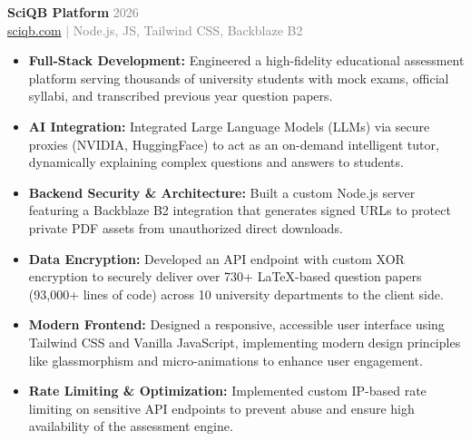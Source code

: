 \documentclass[a4paper,10pt]{article}
\begin{document}
\begin{minipage}[t]{12.2cm}
    \textbf{SciQB Platform} \hfill \textcolor{GrayText}{2026}\\
    \textcolor{GrayText}{\href{https://sciqb.com}{sciqb.com} $|$ Node.js, JS, Tailwind CSS, Backblaze B2}\\
    \begin{itemize}[leftmargin=*, noitemsep, topsep=0pt, label={\color{DarkText}\textbullet}]
        \color{LightText}\small
        \item \textbf{Full-Stack Development:} Engineered a high-fidelity educational assessment platform serving thousands of university students with mock exams, official syllabi, and transcribed previous year question papers.
        \item \textbf{AI Integration:} Integrated Large Language Models (LLMs) via secure proxies (NVIDIA, HuggingFace) to act as an on-demand intelligent tutor, dynamically explaining complex questions and answers to students.
        \item \textbf{Backend Security \& Architecture:} Built a custom Node.js server featuring a Backblaze B2 integration that generates signed URLs to protect private PDF assets from unauthorized direct downloads.
        \item \textbf{Data Encryption:} Developed an API endpoint with custom XOR encryption to securely deliver over 730+ LaTeX-based question papers (93,000+ lines of code) across 10 university departments to the client side.
        \item \textbf{Modern Frontend:} Designed a responsive, accessible user interface using Tailwind CSS and Vanilla JavaScript, implementing modern design principles like glassmorphism and micro-animations to enhance user engagement.
        \item \textbf{Rate Limiting \& Optimization:} Implemented custom IP-based rate limiting on sensitive API endpoints to prevent abuse and ensure high availability of the assessment engine.
    \end{itemize}
    \vspace{0.3cm}


\end{minipage}
\end{document}
